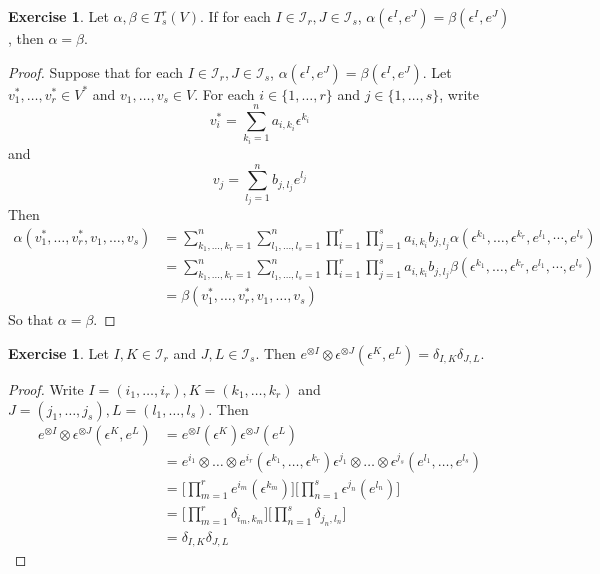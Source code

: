 \documentclass{book}
\theoremstyle{definition}
\newtheorem{ex}[definition]{Exercise}
\newcommand{\al}{\alpha}
\newcommand{\be}{\beta}
\newcommand{\del}{\delta}
\newcommand{\ep}{\epsilon}
\newcommand{\MI}{\mathcal{I}}
\DeclareMathOperator*{\0}{\mbf{0}}
\DeclareMathOperator*{\1}{\mbf{1}}
\begin{document}
	\begin{ex}
	Let $\al, \be \in T^r_s(V)$. If for each $I \in \MI_r, J \in \MI_s$, $\al(\ep^I, e^J) = \be(\ep^I, e^J)$, then $\al = \be$.
	\end{ex}
	
	\begin{proof}
	Suppose that for each $I \in \MI_r, J \in \MI_s$, $\al(\ep^I, e^J) = \be(\ep^I, e^J)$. Let $v^*_1, \dots, v^*_r \in V^*$ and $v_1, \dots, v_s \in V$. For each $i \in \{1, \dots, r\}$ and $j \in \{1, \dots, s\}$, write $$v^*_i = \sum\limits_{k_i = 1}^n a_{i, k_i} \ep^{k_i}$$ and $$v_j = \sum\limits_{l_j = 1}^n b_{j, l_j} e^{l_j}$$
	Then 
	\begin{align*}
	\al(v^*_1, \dots, v^*_r, v_1, \dots, v_s)
	&= \sum_{k_1, \dots, k_r =1}^n \sum_{l_1, \dots, l_s = 1}^n \prod_{i=1}^r \prod_{j=1}^s a_{i, k_i} b_{j, l_j} \al(\ep^{k_1}, \dots, \ep^{k_r}, e^{l_1}, \cdots, e^{l_s}) \\
	&= \sum_{k_1, \dots, k_r =1}^n \sum_{l_1, \dots, l_s = 1}^n \prod_{i=1}^r \prod_{j=1}^s a_{i, k_i} b_{j, l_j} \be(\ep^{k_1}, \dots, \ep^{k_r}, e^{l_1}, \cdots, e^{l_s}) \\
	&= \be(v^*_1, \dots, v^*_r, v_1, \dots, v_s)
	\end{align*}
	So that $\al = \be$.
	\end{proof}
		
	\begin{ex}
	Let $I, K \in \MI_r$  and $J, L \in \MI_s$. Then $e^{\otimes I} \otimes \ep^{\otimes J}(\ep^K, e^L) = \del_{I,K} \del_{J,L}$. 
	\end{ex}	
	
	\begin{proof}
	Write $I = (i_1, \dots, i_r), K=(k_1, \dots, k_r)$ and $J = (j_1, \dots, j_s), L = (l_1, \dots, l_s)$. Then 
	\begin{align*}
	e^{\otimes I} \otimes \ep^{\otimes J}(\ep^K, e^L) 
	&= e^{\otimes I}(\ep^K)\ep^{\otimes J}(e^L) \\
	&= e^{i_1}\otimes \dots \otimes e^{i_r}(\ep^{k_1}, \dots, \ep^{k_r}) \ep^{j_1}\otimes \dots \otimes \ep^{j_s}(e^{l_1}, \dots, e^{l_s}) \\
	&=\bigg[\prod_{m=1}^r e^{i_m}(\ep^{k_m}) \bigg] \bigg[ \prod_{n=1}^s  \ep^{j_n}(e^{l_n}) \bigg] \\
	&= \bigg[\prod_{m=1}^r \del_{i_m, k_m} \bigg] \bigg[ \prod_{n=1}^s  \del_{j_n, l_n} \bigg] \\
	&= \del_{I,K}\del_{J,L}
	\end{align*}
\end{proof}		
		
\end{document}
